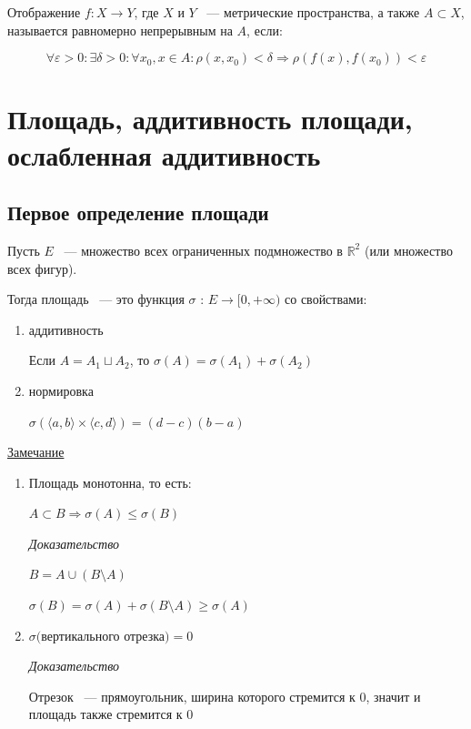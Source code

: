 \documentclass{article}
\begin{document}
		Отображение $f : X \rightarrow Y$, где $X$ и $Y$ ~--- метрические пространства, а также $A \subset X$, называется равномерно непрерывным на $A$, если:
			
		$$\forall \varepsilon > 0 : \exists \delta > 0 : \forall x_0, x \in A : \rho(x, x_0) < \delta \Longrightarrow \rho(f(x), f(x_0)) < \varepsilon$$
			
	\newpage
		
	\section{Площадь, аддитивность площади, ослабленная аддитивность}
		
		\subsection{Первое определение площади}
			
			Пусть $E$ ~--- множество всех ограниченных подмножество в $\mathbb{R}^2$ (или множество всех фигур).
			
			Тогда площадь ~--- это функция $\sigma$ : $E \rightarrow [0, +\infty)$ со свойствами:
			
			\begin{enumerate}
			
				\item аддитивность
				
					Если $A = A_1 \sqcup A_2$, то $\sigma(A) = \sigma(A_1) + \sigma(A_2)$
				
				\item нормировка
				
					$\sigma(\langle a, b \rangle \times \langle c, d \rangle) = (d - c)(b - a)$ 
		
			\end{enumerate}
			
			\underline{Замечание}
			
                \begin{enumerate}
                
                    \item Площадь монотонна, то есть:	
			
                        $A \subset B \Rightarrow \sigma(A) \leq \sigma(B)$
			
                        \textit{Доказательство}
                        
                        $B = A \cup (B \setminus A)$
                        
                        $\sigma(B) = \sigma(A) + \sigma(B \setminus A) \geq \sigma(A)$
                        
                    \item $\sigma($вертикального отрезка$) = 0$
                        
                        \textit{Доказательство}
                        
                        Отрезок ~--- прямоугольник, ширина которого стремится к $0$, значит и площадь также стремится к $0$
                        
				\end{enumerate}
				
\end{document}
